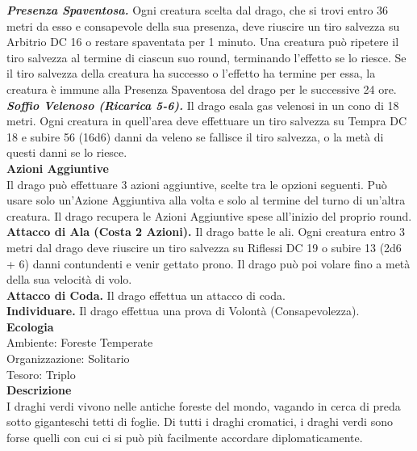 \begin{multicols}{2}
\emph{\textbf{Presenza Spaventosa.}} Ogni creatura scelta dal drago, che si trovi entro 36 metri da esso e consapevole della sua presenza, deve riuscire un tiro salvezza su Arbitrio DC 16 o restare spaventata per 1 minuto. Una creatura può ripetere il tiro salvezza al termine di ciascun suo round, terminando l'effetto se lo riesce. Se il tiro salvezza della creatura ha successo o l'effetto ha termine per essa, la creatura è immune alla Presenza Spaventosa del drago per le successive 24 ore.\\
\emph{\textbf{Soffio Velenoso (Ricarica 5-6).}} Il drago esala gas velenosi in un cono di 18 metri. Ogni creatura in quell'area deve effettuare un tiro salvezza su Tempra DC 18 e subire 56 (16d6) danni da veleno se fallisce il tiro salvezza, o la metà di questi danni se lo riesce.\\
\textbf{Azioni Aggiuntive}\\
Il drago può effettuare 3 azioni aggiuntive, scelte tra le opzioni seguenti. Può usare solo un'Azione Aggiuntiva alla volta e solo al termine del turno di un'altra creatura. Il drago recupera le Azioni Aggiuntive spese all'inizio del proprio round.
\textbf{Attacco di Ala (Costa 2 Azioni).} Il drago batte le ali. Ogni creatura entro 3 metri dal drago deve riuscire un tiro salvezza su Riflessi DC 19 o subire 13 (2d6 + 6) danni contundenti e venir gettato prono. Il drago può poi volare fino a metà della sua velocità di volo.\\
\textbf{Attacco di Coda.} Il drago effettua un attacco di coda.\\
\textbf{Individuare.} Il drago effettua una prova di Volontà (Consapevolezza).\\
\textbf{Ecologia}\\
Ambiente: Foreste Temperate\\
Organizzazione: Solitario\\
Tesoro: Triplo\\
\textbf{Descrizione}\\
I draghi verdi vivono nelle antiche foreste del mondo, vagando in cerca di preda sotto giganteschi tetti di foglie. Di tutti i draghi cromatici, i draghi verdi sono forse quelli con cui ci si può più facilmente accordare diplomaticamente.\\


\end{multicols}
